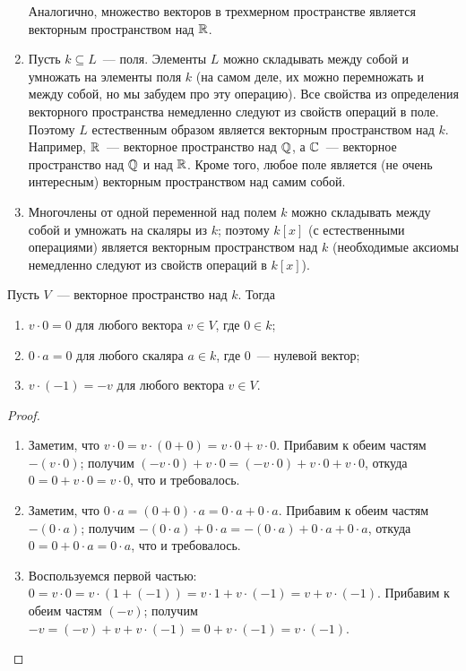 \begin{examples}
\begin{enumerate}
  Аналогично, множество векторов в трехмерном пространстве является
  векторным пространством над $\mathbb R$.
\item Пусть $k\subseteq L$~--- поля. Элементы $L$ можно складывать
  между собой и умножать на элементы поля $k$ (на самом деле, их можно
  перемножать и между собой, но мы забудем про эту операцию). Все
  свойства из определения векторного пространства немедленно следуют
  из свойств операций в поле. Поэтому
  $L$ естественным образом является векторным пространством над
  $k$. Например, $\mathbb R$~--- векторное пространство над $\mathbb Q$, а
  $\mathbb C$~--- векторное пространство над $\mathbb Q$ и над $\mathbb R$. Кроме
  того, любое поле является (не очень интересным) векторным
  пространством над самим собой.
\item Многочлены от одной переменной над полем $k$ можно складывать
  между собой и умножать на скаляры из $k$; поэтому $k[x]$ (с
  естественными операциями) является векторным пространством над $k$
  (необходимые аксиомы немедленно следуют из свойств операций в
  $k[x]$).
\end{enumerate}
\end{examples}

\begin{proposition}
Пусть $V$~--- векторное пространство над $k$. Тогда
\begin{enumerate}
\item $v\cdot 0=0$ для любого вектора $v\in V$, где  $0\in k$;
\item $0\cdot a = 0$ для любого скаляра $a\in k$, где $0$~--- нулевой вектор;
\item $v\cdot (-1)=-v$ для любого вектора $v\in V$.
\end{enumerate}
\end{proposition}
\begin{proof}
\begin{enumerate}
\item Заметим, что $v\cdot 0 = v\cdot (0+0) = v\cdot 0 + v\cdot
  0$. Прибавим к обеим частям $-(v\cdot 0)$; получим
  $(-v\cdot 0) + v\cdot 0 = (-v\cdot 0) + v\cdot 0 + v\cdot 0$, откуда
  $0=0+v\cdot 0=v\cdot 0$, что и требовалось.
\item  Заметим, что $0\cdot a = (0+0)\cdot a = 0\cdot a
+ 0\cdot a$. Прибавим к обеим частям $-(0\cdot a)$; получим
$-(0\cdot a) + 0\cdot a = -(0\cdot a) + 0\cdot a
+ 0\cdot a$, откуда $0 = 0 + 0\cdot a = 0\cdot a$,
что и требовалось.
\item Воспользуемся первой частью: $0 = v\cdot 0 = v\cdot (1+(-1)) =
  v\cdot 1 + v\cdot (-1) = v + v\cdot (-1)$. Прибавим к обеим частям
  $(-v)$; получим $-v = (-v) + v + v\cdot (-1) = 0 + v\cdot (-1) =
  v\cdot (-1)$.
\end{enumerate}
\end{proof}

